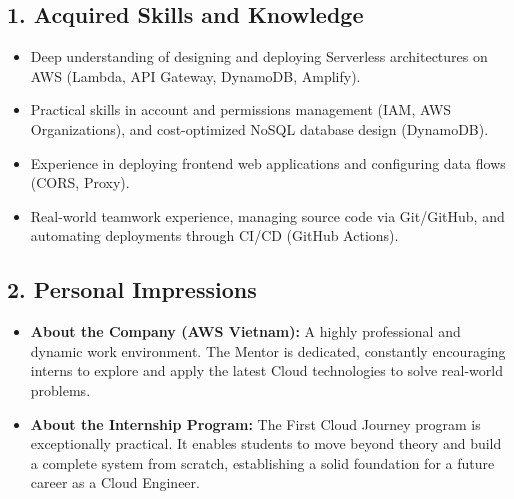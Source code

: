 \documentclass[a4paper]{article}
\begin{document}
\subsection*{1. Acquired Skills and Knowledge}
\begin{itemize}
    \item Deep understanding of designing and deploying Serverless architectures on AWS (Lambda, API Gateway, DynamoDB, Amplify).
    \item Practical skills in account and permissions management (IAM, AWS Organizations), and cost-optimized NoSQL database design (DynamoDB).
    \item Experience in deploying frontend web applications and configuring data flows (CORS, Proxy).
    \item Real-world teamwork experience, managing source code via Git/GitHub, and automating deployments through CI/CD (GitHub Actions).
\end{itemize}

\subsection*{2. Personal Impressions}
\begin{itemize}
    \item \textbf{About the Company (AWS Vietnam):} A highly professional and dynamic work environment. The Mentor is dedicated, constantly encouraging interns to explore and apply the latest Cloud technologies to solve real-world problems.
    \item \textbf{About the Internship Program:} The First Cloud Journey program is exceptionally practical. It enables students to move beyond theory and build a complete system from scratch, establishing a solid foundation for a future career as a Cloud Engineer.
\end{itemize}

\end{document}
